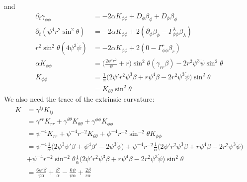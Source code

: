 \documentclass[12pt]{article}
\numberwithin{equation}{section}
\begin{document}
and
\begin{equation}
\begin{aligned}
\partial_t \gamma_{\phi \phi} &= -2 \alpha K_{\phi \phi} + D_\phi \beta_\phi + D_\phi \beta_\phi \\
\partial_t (\psi^4 r^2 \sin^2 \theta) &= -2 \alpha K_{\phi \phi} + 2 (\partial_\phi \beta_\phi - \Gamma^{\lambda}_{\phi \phi} \beta_\lambda) \\
r^2 \sin^2 \theta (4 \psi^3 \dot{\psi}) &= -2 \alpha K_{\phi \phi} + 2 (0 - \Gamma^{r}_{\phi \phi} \beta_r) \\
\alpha K_{\phi \phi} &= \Big( \frac{2 \psi' r^2}{\psi} + r \Big) \sin^2 \theta ( \gamma_{rr} \beta) - 2 r^2 \psi^3 \dot{\psi} \sin^2 \theta \\
K_{\phi \phi} &= \frac{1}{\alpha} \Big( 2 \psi' r^2 \psi^3 \beta + r \psi^4 \beta - 2 r^2 \psi^3 \dot{\psi} \Big) \sin^2 \theta \\
&= K_{\theta \theta} \sin^2 \theta
\end{aligned}
\end{equation}
We also need the trace of the extrinsic curvature:
\begin{equation}
\begin{aligned}
K &= \gamma^{ij} K_{ij} \\
&= \gamma^{rr} K_{rr} + \gamma^{\theta \theta} K_{\theta \theta} + \gamma^{\phi \phi} K_{\phi \phi} \\
&= \psi^{-4} K_{rr} + \psi^{-4} r^{-2} K_{\theta \theta} + \psi^{-4} r^{-2} \sin^{-2} \theta K_{\phi \phi} \\
&= \psi^{-4} \frac{1}{\alpha} \Big( 2 \psi^3 \psi' \beta + \psi^4 \beta' - 2 \psi^3 \dot{\psi} \Big) + \psi^{-4} r^{-2} \frac{1}{\alpha} \Big( 2 \psi' r^2 \psi^3 \beta + r \psi^4 \beta - 2 r^2 \psi^3 \dot{\psi} \Big) \\
&+ \psi^{-4} r^{-2} \sin^{-2} \theta \frac{1}{\alpha} \Big( 2 \psi' r^2 \psi^3 \beta + r \psi^4 \beta - 2 r^2 \psi^3 \dot{\psi} \Big) \sin^2 \theta \\
&= \frac{6 \psi' \beta}{\psi \alpha} + \frac{\beta'}{\alpha} - \frac{6 \dot{\psi}}{\psi \alpha} + \frac{2 \beta}{r \alpha} \\
\end{aligned}
\end{equation}
\end{document}
